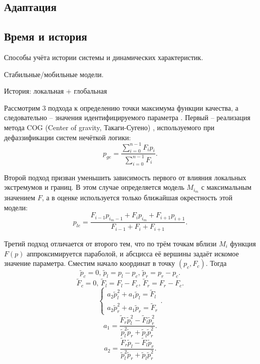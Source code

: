 \subsection{Адаптация}


\subsection{Время и история}

Способы учёта истории системы и динамических характеристик.

Стабильные/мобильные модели.

История: локальная + глобальная




Рассмотрим 3 подхода к определению
точки максимума функции качества, а следовательно -- значения идентифицируемого параметра \cite{atu_st99,atu_jacs2015}.
Первый -- реализация
метода COG (Center of gravity, Такаги-Сугено) \cite{atu_asau25,atu_csit2015},
используемого при дефаззификации систем нечёткой логики:
%
\begin{equation}
  p_{ge}
  =
  \frac{\sum\limits_{i=0}^{n-1} F_{i} p_{i}}
       {\sum\limits_{i=0}^{n-1} F_{i} }
  .
  \label{atu:eq:p_ge}
\end{equation}

Второй подход призван уменьшить зависимость первого
от влияния локальных экстремумов и границ. В этом
случае определяется модель $M_{i_{m}}$ с максимальным значением
$F$, а в оценке используется только ближайшая окрестность этой модели:
%
\begin{equation}
  p_{le}
  =
  \frac{ F_{i-1} p_{i_m-1} + F_{i} p_{i_m} + F_{i+1} p_{i+1} }
       { F_{i-1}           + F_{i}         + F_{i+1}         }
  .
  \label{atu:eq:p_le}
\end{equation}

Третий подход отличается от второго тем, что по трём точкам вблизи  $M_{i}$
функция $F(p)$ аппроксимируется параболой, и абсцисса её вершины задаёт искомое
значение параметра. Сместим начало координат в точку
$ ( p_c, F_c ) $. Тогда
%
\[
  \tilde{p}_c = 0, \,
  \tilde{p}_l = p_l - p_c, \,
  \tilde{p}_r = p_r - p_c.
\]
%
\[
  \tilde{F}_c = 0, \,
  \tilde{F}_l = F_l - F_c, \,
  \tilde{F}_r = F_r - F_c.
\]
%
\[
  \left\{
    \begin{array}{l}
      a_2 \tilde{p}_l^2 + a_1 \tilde{p}_l  = \tilde{F}_l
      \\
      a_2 \tilde{p}_r^2 + a_1 \tilde{p}_r  = \tilde{F}_r
    \end{array}
  \right. .
\]
%
\[
  a_1 = \frac{\tilde{F}_r \tilde{p}_l^2 - \tilde{F}_l \tilde{p}_r^2 }
             { \tilde{p}_l^2 \tilde{p}_r  + \tilde{p}_l \tilde{p}_r^2 }.
\]
%
\[
  a_2 = \frac{\tilde{F}_r \tilde{p}_l - \tilde{F}_l \tilde{p}_r }
             { \tilde{p}_l^2 \tilde{p}_r  + \tilde{p}_l \tilde{p}_r^2 }.
\]

